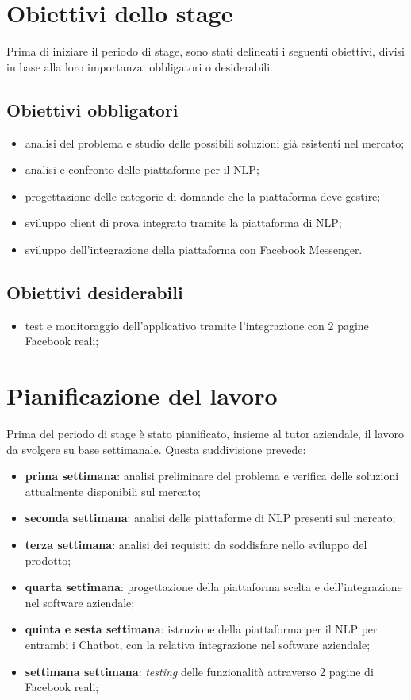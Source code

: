 \section{Obiettivi dello stage}
\label{obiettivi}
Prima di iniziare il periodo di stage, sono stati delineati i seguenti obiettivi, divisi in base alla loro importanza: obbligatori o desiderabili.

\subsection{Obiettivi obbligatori}
\begin{itemize}
	\item analisi del problema e studio delle possibili soluzioni già esistenti nel mercato;
	\item analisi e confronto delle piattaforme per il \gls{NLP};
	\item progettazione delle categorie di domande che la piattaforma deve gestire;
	\item sviluppo client di prova integrato tramite la piattaforma di \gls{NLP};
	\item sviluppo dell'integrazione della piattaforma con Facebook Messenger.
\end{itemize}

\subsection{Obiettivi desiderabili}
\begin{itemize}
	\item test e monitoraggio dell’applicativo tramite l’integrazione con 2 pagine Facebook reali;
\end{itemize}

\section{Pianificazione del lavoro}
Prima del periodo di stage è stato pianificato, insieme al tutor aziendale, il lavoro da svolgere su base settimanale. Questa suddivisione prevede:
\begin{itemize}
	\item \textbf{prima settimana}: analisi preliminare del problema e verifica delle soluzioni attualmente disponibili sul mercato;
	\item \textbf{seconda settimana}: analisi delle piattaforme di \gls{NLP} presenti sul mercato;
	\item \textbf{terza settimana}: analisi dei requisiti da soddisfare nello sviluppo del prodotto;
	\item \textbf{quarta settimana}: progettazione della piattaforma scelta e dell'integrazione nel software aziendale;
	\item \textbf{quinta e sesta settimana}: istruzione della piattaforma per il \gls{NLP} per entrambi i \gls{Chatbot}, con la relativa integrazione nel software aziendale;
	\item \textbf{settimana settimana}: \emph{testing} delle funzionalità attraverso 2 pagine di Facebook reali;
\end{itemize}

